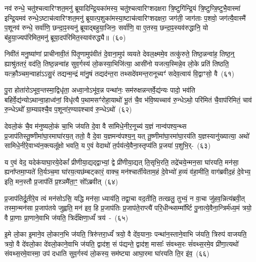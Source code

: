 नव॑ रुन्धे॒ चतु॑श्चत्वारिꣳशत॒मनु॑ ब्रूयादिन्द्रि॒यका॑मस्य॒ चतु॑श्चत्वारिꣳशद\-क्षरा त्रि॒ष्टुगि॑न्द्रि॒यं त्रि॒ष्टुप्त्रि॒ष्टुभै॒वास्मा॑ इन्द्रि॒यमव॑ रुन्धे॒\-ऽष्टाच॑त्वारिꣳशत॒मनु॑ ब्रूयात्प॒शुका॑मस्या॒ष्टाच॑त्वारिꣳशद\-क्षरा॒ जग॑ती॒ जाग॑ताः प॒शवो॒ जग॑त्यै॒वास्मै॑ प॒शूनव॑ रुन्धे॒ सर्वा॑णि॒ छन्दा॒ꣴ॒स्यनु॑ ब्रूयाद्बहुया॒जिनः॒ सर्वा॑णि॒ वा ए॒तस्य॒ छन्दा॒ꣴ॒स्यव॑रुद्धानि॒ यो ब॑हुया॒ज्यप॑रिमित॒मनु॑ ब्रूया॒दप॑रिमित॒स्याव॑रुद्ध्यै॥~(६०)\ip

{\anuvakamend[{का॒मये॑त॒ प्रति॑ष्ठित्यै प॒शून्थ्स॒प्तच॑त्वारिꣳशच्च}]}%

निवी॑तं मनु॒ष्या॑णां प्राचीनावी॒तं पि॑तृ॒णामुप॑वीतं दे॒वाना॒मुप॑ व्ययते देवल॒क्ष्ममे॒व तत्कु॑रुते॒ तिष्ठ॒न्नन्वा॑ह॒ तिष्ठ॒न्॒ ह्याश्रु॑ततरं॒ वद॑ति॒ तिष्ठ॒न्नन्वा॑ह सुव॒र्गस्य॑ लो॒कस्या॒भिजि॑त्या॒ आसी॑नो यजत्य॒स्मिन्ने॒व लो॒के प्रति॑ तिष्ठति॒ यत्क्रौ॒ञ्चम॒न्वाहा॑\-ऽऽ\-सु॒रं तद्यन्म॒न्द्रं मा॑नु॒षं तद्यद॑न्त॒रा तथ्सदे॑वमन्त॒रानूच्यꣳ॑ सदेव॒त्वाय॑ वि॒द्वाꣳसो॒ वै~(६१)\ip

पु॒रा होता॑रो\-ऽभूव॒न्तस्मा॒द्विधृ॑ता॒ अध्वा॒नो\-ऽभू॑व॒न्न पन्था॑नः॒ सम॑रुक्षन्नन्तर्वे॒द्य॑न्यः पादो॒ भव॑ति बहिर्वे॒द्य॑न्यो\-ऽथान्वा॒हाध्व॑नां॒ विधृ॑त्यै प॒थामसꣳ॑रोहा॒याथो॑ भू॒तं चै॒व भ॑वि॒ष्यच्चाव॑ रु॒न्धे\-ऽथो॒ परि॑मितं चै॒वाप॑रिमितं॒ चाव॑ रु॒न्धे\-ऽथो᳚ ग्रा॒म्याꣴश्चै॒व प॒शूना॑र॒ण्याꣴश्चाव॑ रु॒न्धे\-ऽथो॑~(६२)\ip

देवलो॒कं चै॒व म॑नुष्यलो॒कं चा॒भि ज॑यति दे॒वा वै सा॑मिधे॒नीर॒नूच्य॑ य॒ज्ञं नान्व॑पश्य॒न्थ्स प्र॒जा\-प॑तिस्तू॒ष्णीमा॑घा॒र\-माघा॑र\-य॒त् ततो॒ वै दे॒वा य॒ज्ञमन्व॑पश्य॒न्॒ यत् तू॒ष्णीमा॑\-घा॒रमा॑\-घा॒रय॑ति य॒ज्ञस्यानु॑\-ख्यात्या॒ अथो॑ सामिधे॒नीरे॒वाभ्य॑न॒क्त्यलू᳚क्षो भवति॒ य ए॒वं वेदाथो॑ त॒र्पय॑त्ये॒वैना॒स्तृप्य॑ति प्र॒जया॑ प॒शुभि॒र्-~(६३)\ip

य ए॒वं वेद॒ यदेक॑याघा॒रये॒देकां᳚ प्रीणीया॒द्यद्द्वाभ्यां॒ द्वे प्री॑णीया॒द्यत् ति॒सृभि॒रति॒ तद्रे॑चये॒न्मन॒सा घा॑रयति॒ मन॑सा॒ ह्यना᳚प्तमा॒प्यते॑ ति॒र्यञ्च॒मा घा॑रय॒त्यछ॑म्बट्कारं॒ वाक्च॒ मन॑श्चार्तीयेताम॒हं दे॒वेभ्यो॑ ह॒व्यं व॑हा॒मीति॒ वाग॑ब्रवीद॒हं दे॒वेभ्य॒ इति॒ मन॒स्तौ प्र॒जा\-प॑तिं प्र॒श्ञमै॑ता॒ꣳ॒ सो᳚\-ऽब्रवीत्~(६४)\ip

प्र॒जा\-प॑तिर्दू॒तीरे॒व त्वं मन॑सो\-ऽसि॒ यद्धि मन॑सा॒ ध्याय॑ति॒ तद्वा॒चा वद॒तीति॒ तत्खलु॒ तुभ्यं॒ न वा॒चा जु॑हव॒न्नित्य॑ब्रवी॒त् तस्मा॒न्मन॑सा प्र॒जा\-प॑तये जुह्वति॒ मन॑ इव॒ हि प्र॒जा\-प॑तिः प्र॒जा\-प॑ते॒राप्त्यै॑ परि॒धीन्थ्सम्मा᳚र्ष्टि पु॒नात्ये॒वैना॒न्त्रिर्म॑ध्य॒मं त्रयो॒ वै प्रा॒णाः प्रा॒णाने॒वाभि ज॑यति॒ त्रिर्द॑क्षिणा॒र्ध्यं॑ त्रय॑~-~(६५)\ip

इ॒मे लो॒का इ॒माने॒व लो॒कान॒भि ज॑यति॒ त्रिरु॑त्तरा॒र्ध्यं॑ त्रयो॒ वै दे॑व॒यानाः॒ पन्था॑न॒स्ताने॒वाभि ज॑यति॒ त्रिरुप॑ वाजयति॒ त्रयो॒ वै दे॑वलो॒का दे॑वलो॒काने॒वाभि ज॑यति॒ द्वाद॑श॒ सं प॑द्यन्ते॒ द्वाद॑श॒ मासाः᳚ संवथ्स॒रः सं॑वथ्स॒रमे॒व प्री॑णा॒त्यथो॑ संवथ्स॒रमे॒वास्मा॒ उप॑ दधाति सुव॒र्गस्य॑ लो॒कस्य॒ सम॑ष्ट्या आघा॒रमा घा॑रयति ति॒र इ॑व॒~(६६)\ip

